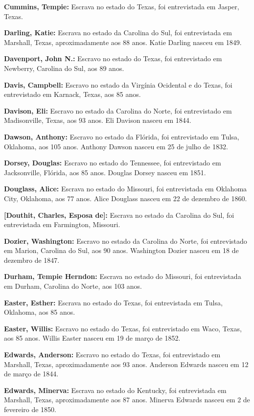 \textbf{Cummins, Tempie:} Escrava no estado do Texas, foi entrevistada
em Jasper, Texas.

\textbf{Darling, Katie:} Escrava no estado da Carolina do Sul, foi
entrevistada em Marshall, Texas, aproximadamente aos 88 anos. Katie
Darling nasceu em 1849.

\textbf{Davenport, John N.:} Escravo no estado do Texas, foi
entrevistado em Newberry, Carolina do Sul, aos 89 anos.

\textbf{Davis, Campbell:} Escravo no estado da Virgínia Ocidental e do
Texas, foi entrevistado em Karnack, Texas, aos 85 anos.

\textbf{Davison, Eli:} Escravo no estado da Carolina do Norte, foi
entrevistado em Madisonville, Texas, aos 93 anos. Eli Davison nasceu em
1844.

\textbf{Dawson, Anthony:} Escravo no estado da Flórida, foi entrevistado
em Tulsa, Oklahoma, aos 105 anos. Anthony Dawson nasceu em 25 de julho
de 1832.

\textbf{Dorsey, Douglas:} Escravo no estado do Tennessee, foi
entrevistado em Jacksonville, Flórida, aos 85 anos. Douglas Dorsey
nasceu em 1851.

\textbf{Douglass, Alice:} Escrava no estado do Missouri, foi
entrevistada em Oklahoma City, Oklahoma, aos 77 anos. Alice Douglass
nasceu em 22 de dezembro de 1860.

\textbf{{[}Douthit, Charles, Esposa de{]}:} Escrava no estado da
Carolina do Sul, foi entrevistada em Farmington, Missouri.

\textbf{Dozier, Washington:} Escravo no estado da Carolina do Norte, foi
entrevistado em Marion, Carolina do Sul, aos 90 anos. Washington Dozier
nasceu em 18 de dezembro de 1847.

\textbf{Durham, Tempie Herndon:} Escrava no estado do Missouri, foi
entrevistada em Durham, Carolina do Norte, aos 103 anos.

\textbf{Easter, Esther:} Escrava no estado do Texas, foi entrevistada em
Tulsa, Oklahoma, aos 85 anos.

\textbf{Easter, Willis:} Escravo no estado do Texas, foi entrevistado em
Waco, Texas, aos 85 anos. Willis Easter nasceu em 19 de março de 1852.

\textbf{Edwards, Anderson:} Escravo no estado do Texas, foi entrevistado
em Marshall, Texas, aproximadamente aos 93 anos. Anderson Edwards nasceu
em 12 de março de 1844.

\textbf{Edwards, Minerva:} Escrava no estado do Kentucky, foi
entrevistada em Marshall, Texas, aproximadamente aos 87 anos. Minerva
Edwards nasceu em 2 de fevereiro de 1850.

